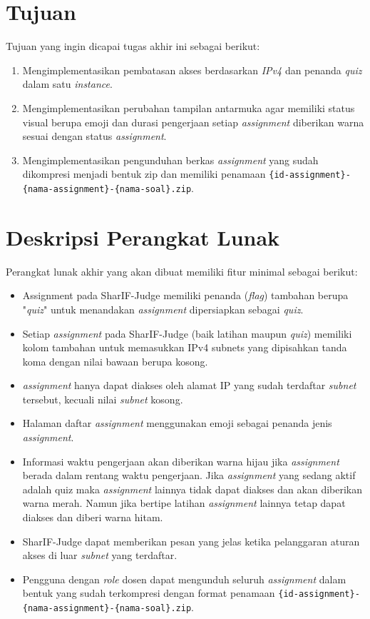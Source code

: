\documentclass[a4paper,twoside]{article}
\begin{document}
	\section{Tujuan}
	Tujuan yang ingin dicapai tugas akhir ini sebagai berikut:
	\begin{enumerate}
     \item Mengimplementasikan pembatasan akses berdasarkan \textit{IPv4} dan penanda \textit{quiz} dalam satu \textit{instance}.
     \item Mengimplementasikan perubahan tampilan antarmuka agar memiliki status visual berupa emoji dan durasi pengerjaan setiap \textit{assignment} diberikan warna sesuai dengan status \textit{assignment}.
     \item Mengimplementasikan pengunduhan berkas \textit{assignment} yang sudah dikompresi menjadi bentuk zip dan memiliki penamaan \texttt{\{id-assignment\}-\{nama-assignment\}-\{nama-soal\}.zip}.
 	\end{enumerate}

	\section{Deskripsi Perangkat Lunak}
	Perangkat lunak akhir yang akan dibuat memiliki fitur minimal sebagai berikut:
	\begin{itemize}
		\item Assignment pada SharIF-Judge memiliki penanda (\textit{flag}) tambahan berupa "\textit{quiz}" untuk menandakan \textit{assignment} dipersiapkan sebagai \textit{quiz}.
		\item Setiap \textit{assignment} pada SharIF-Judge (baik latihan maupun \textit{quiz}) memiliki kolom tambahan untuk memasukkan IPv4 subnets yang dipisahkan tanda koma dengan nilai bawaan berupa kosong.
		\item \textit{assignment} hanya dapat diakses oleh alamat IP yang sudah terdaftar \textit{subnet} tersebut, kecuali nilai \textit{subnet} kosong.
		\item Halaman daftar \textit{assignment} menggunakan emoji sebagai penanda jenis \textit{assignment}.
		\item Informasi waktu pengerjaan akan diberikan warna hijau jika \textit{assignment} berada dalam rentang waktu pengerjaan. Jika \textit{assignment} yang sedang aktif adalah quiz maka \textit{assignment} lainnya tidak dapat diakses dan akan diberikan warna merah. Namun jika bertipe latihan \textit{assignment} lainnya tetap dapat diakses dan diberi warna hitam.
		\item SharIF-Judge dapat memberikan pesan yang jelas ketika pelanggaran aturan akses di luar \textit{subnet} yang terdaftar.
		\item Pengguna dengan \textit{role} dosen dapat mengunduh seluruh \textit{assignment} dalam bentuk yang sudah terkompresi dengan format penamaan \texttt{\{id-assignment\}-\{nama-assignment\}-\{nama-soal\}.zip}.
		
	\end{itemize}
	
\end{document}
